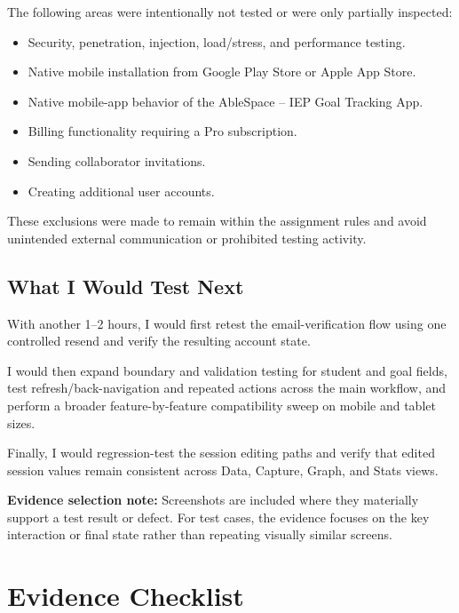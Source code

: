 \documentclass[11pt,a4paper]{article}
\begin{document}
The following areas were intentionally not tested or were only partially inspected:

\begin{itemize}
    \item Security, penetration, injection, load/stress, and performance testing.
    \item Native mobile installation from Google Play Store or Apple App Store.
    \item Native mobile-app behavior of the AbleSpace -- IEP Goal Tracking App.
    \item Billing functionality requiring a Pro subscription.
    \item Sending collaborator invitations.
    \item Creating additional user accounts.
\end{itemize}

These exclusions were made to remain within the assignment rules and avoid unintended external communication or prohibited testing activity.

\subsection{What I Would Test Next}

With another 1--2 hours, I would first retest the email-verification flow using one controlled resend and verify the resulting account state.

I would then expand boundary and validation testing for student and goal fields, test refresh/back-navigation and repeated actions across the main workflow, and perform a broader feature-by-feature compatibility sweep on mobile and tablet sizes.

Finally, I would regression-test the session editing paths and verify that edited session values remain consistent across Data, Capture, Graph, and Stats views.

\noindent
\textbf{Evidence selection note:} Screenshots are included where they materially support a test result or defect. For test cases, the evidence focuses on the key interaction or final state rather than repeating visually similar screens.


\appendix

\section{Evidence Checklist}
\end{document}
